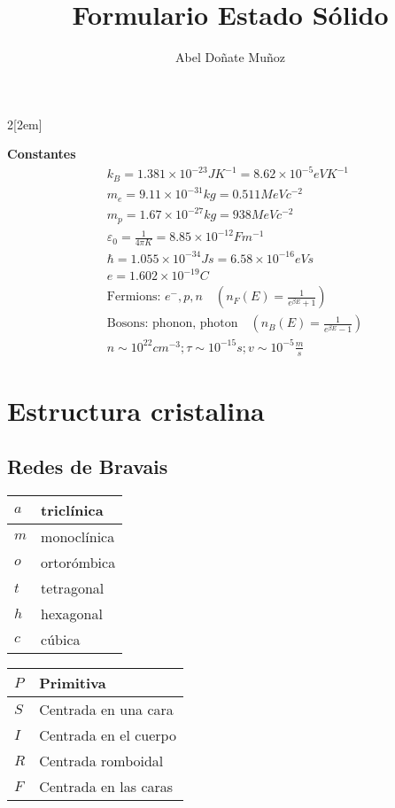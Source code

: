 \documentclass[leqno]{article}
\title{Formulario Estado Sólido}
\author{Abel Doñate Muñoz}
\date{}
\begin{document}
\begin{multicols}{2}[\columnsep2em]

\textbf{Constantes}
\begin{align*}
&k_B = 1.381\times 10^{-23}JK^{-1} = 8.62\times 10^{-5}eVK^{-1}\\
&m_e = 9.11\times 10^{-31}kg = 0.511MeVc^{-2}\\
&m_p = 1.67\times 10^{-27}kg = 938MeVc^{-2}\\
&\varepsilon _0 = \frac{1}{4\pi K} = 8.85\times 10^{-12} Fm^{-1}\\
&\hbar = 1.055\times 10^{-34} Js = 6.58\times 10^{-16}eVs \\
&e = 1.602 \times 10^{-19} C\\
&\text{Fermions: }e^-, p, n \quad (n_F(E) = \frac{1}{e ^{\beta E}+1})\\
& \text{Bosons: phonon, photon} \quad (n_B(E)=\frac{1}{e ^{\beta E} -1})\\
& n\sim 10 ^{22}cm ^{-3}; \tau \sim 10 ^{-15}s; v\sim 10 ^{-5}\frac{m}{s}
\end{align*}



\section{Estructura cristalina}
\subsection{Redes de Bravais}
\begin{minipage}{0.45\columnwidth}
\begin{center}
\begin{tabular}{|l|l|}
\hline
$a$ & triclínica  \\ \hline
$m$ & monoclínica\\ \hline
$o$ & ortorómbica\\ \hline
$t$ & tetragonal \\ \hline
$h$ & hexagonal\\ \hline
$c$ & cúbica \\ \hline
\end{tabular}
\end{center}
\end{minipage}
\begin{minipage}{0.45\columnwidth}
\begin{center}
\begin{tabular}{|l|l|}
\hline
$P$ & Primitiva \\\hline
$S$ & Centrada en una cara\\\hline
$I$ & Centrada en el cuerpo\\\hline
$R$ & Centrada romboidal\\\hline
$F$ & Centrada en las caras \\\hline
\end{tabular}
\end{center}
\end{minipage}


\end{multicols}
\end{document}
